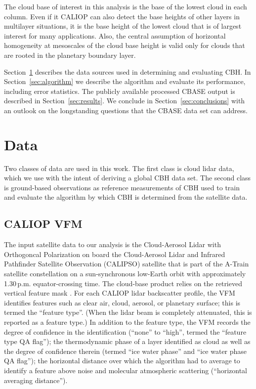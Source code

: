 \documentclass[essd,manuscript]{copernicus}\usepackage[]{graphicx}\usepackage[]{color}
\begin{document}
The cloud base of interest in this analysis is the base of the lowest cloud in
each column. Even if it CALIOP can also detect the base heights of other layers
in multilayer situations, it is the base height of the lowest cloud that is of
largest interest for many applications. Also, the central assumption of
horizontal homogeneity at mesoscales of the cloud base height is valid only for
clouds that are rooted in the planetary boundary layer.

Section~\ref{sec:data} describes the data sources used in determining and
evaluating CBH.  In Section~\ref{sec:algorithm} we describe
the algorithm and evaluate its performance, including error statistics.  The
publicly available processed CBASE output is described in
Section~\ref{sec:results}.  We conclude in Section~\ref{sec:conclusions} with an
outlook on the longstanding questions that the CBASE data set can address.

\section{Data}
\label{sec:data}

Two classes of data are used in this work.  The first class is cloud lidar data,
which we use with the intent of deriving a global CBH data set.
The second class is ground-based observations as reference measurements of CBH used
to train and evaluate the algorithm by which CBH is determined from
the satellite data.

\subsection{CALIOP VFM}

The input satellite data to our analysis is the Cloud-Aerosol Lidar with
Orthogoncal Polarization \cite[CALIOP]{winker2007,doi:10.1029/
2007GL030135} on board the Cloud-Aerosol Lidar and Infrared Pathfinder
Satellite Observation (CALIPSO) satellite that is part of the A-Train
satellite constellation \citep{stephens2002,doi:10.1175/BAMS-83-12-1771} on a
sun-synchronous low-Earth orbit with approximately 1.30\,p.m. equator-crossing
time. The cloud-base product relies on the retrieved vertical feature mask
\citep[VFM]{vaughan2002,https://www-calipso.larc.nasa.gov/resources/pdfs/PC-SCI-202_Part2_rev1x01.pdf}.  For each CALIOP lidar backscatter profile, the VFM identifies features
such as clear air, cloud, aerosol, or planetary surface; this is termed the ``feature
type''.  (When the lidar beam is completely attenuated, this is reported as a
feature type.)  In addition to the feature type, the VFM records the degree of
confidence in the identification (``none'' to ``high'', termed the ``feature
type QA flag''); the thermodynamic phase of a layer identified as cloud as well
as the degree of confidence therein (termed ``ice water phase'' and ``ice water
phase QA flag''); the horizontal distance over which the algorithm had to
average to identify a feature above noise and molecular atmospheric scattering
(``horizontal averaging distance'').  
\end{document}

